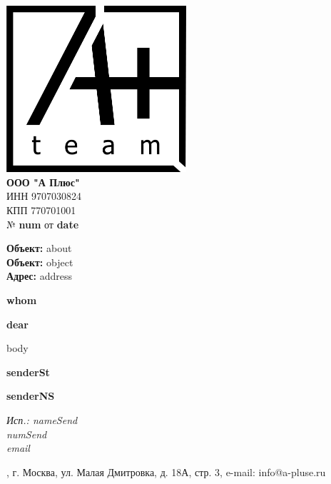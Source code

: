 \documentclass[a4paper,12pt]{letter}
\begin{document}
\noindent
\begin{minipage}[t]{0.5\textwidth}
    \vspace{0pt} %
    \includegraphics[width=0.5\textwidth]{A.png} \\ %
    \textbf{ООО "А Плюс"} \\
    ИНН 9707030824 \\
    КПП 770701001 \\
    № \textbf{ {{num}} } от \textbf{ {{date}} } \\
\end{minipage}%

\begin{minipage}[t]{0.5\textwidth} 
    \textbf{Объект:} {{about}} \\
    \textbf{Объект:} {{object}} \\
    \textbf{Адрес:} {{address}}
\end{minipage}%
\begin{minipage}[t]{0.5\textwidth}
    \raggedleft
    \bfseries
    {{whom}}
\end{minipage}

\vspace{1cm}

\begin{center}
    \textbf{ {{dear}} }
\end{center}


\vspace{0.5cm}

\begin{minipage}[t]{\textwidth}
    \raggedright
    {{body}}

\end{minipage}

\vspace{1cm}


\begin{minipage}[t]{0.4\textwidth}
    \textbf{ {{senderSt}} }
\end{minipage}%
\begin{minipage}[t]{0.2\textwidth}
    \centering
    \underline{\hspace{5cm}}
\end{minipage}%
\begin{minipage}[t]{0.4\textwidth}
    \raggedleft
    \textbf{ {{senderNS}} }
\end{minipage}


\vfill

\noindent
\itshape
Исп.: {{nameSend}} \\
{{numSend}} \\
{{email}}

\noindent\makebox[\linewidth]{\rule{1\paperwidth}{0.4pt}}
\noindent
\centering
\fontsize{9}{10}, г. Москва, ул. Малая Дмитровка, д. 18А, стр. 3, e-mail: info@a-pluse.ru
\end{document}
